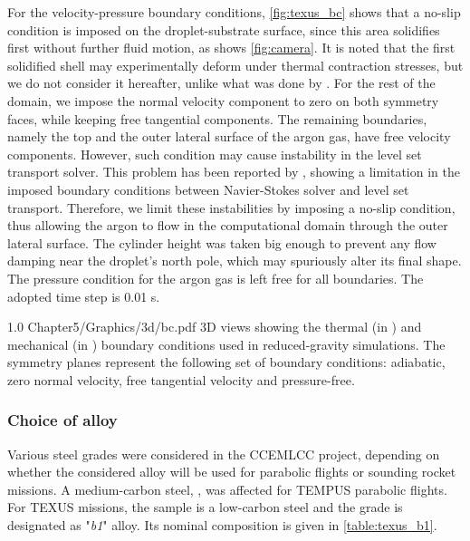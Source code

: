 For the velocity-pressure boundary conditions, \cref{fig:texus_bc} shows that a no-slip condition is imposed
on the droplet-substrate surface, 
since this area solidifies first without further fluid motion, as shows \cref{fig:camera}.
It is noted that the first solidified shell may experimentally deform under thermal contraction stresses, 
but we do not consider it hereafter, unlike what was done by \citet{rivaux_simulation_2011}. 
For the rest of the domain, we impose the normal velocity component to zero on both symmetry faces, 
while keeping free tangential components. The remaining boundaries, namely the top and the outer lateral surface of the argon gas,
have free velocity components. However, such condition may cause instability in the level set transport solver. 
This problem has been reported by \citep{basset_simulation_2006}, showing a limitation in the imposed boundary conditions between Navier-Stokes solver and level set transport. 
Therefore, we limit these instabilities by imposing a no-slip condition, thus allowing the argon to flow in the computational
domain through the outer lateral surface. 
The cylinder height was taken big enough to prevent any flow damping near the droplet's north pole,
which may spuriously alter its final shape. The pressure condition for the argon gas is left free for all boundaries.
The adopted time step is 0.01 s.

\begin{figureth}
{1.0}
{Chapter5/Graphics/3d/bc.pdf}
{3D views showing the thermal (in ) and mechanical (in ) boundary conditions used in reduced-gravity simulations.
The symmetry planes represent the following set of boundary conditions: adiabatic, zero normal velocity, free tangential velocity and pressure-free.}
\label{fig:texus_bc}
\end{figureth}

\subsubsection{Choice of alloy}

Various steel grades were considered in the CCEMLCC project, depending on whether the considered alloy will be used for parabolic flights
or sounding rocket missions. A medium-carbon steel, , was affected for TEMPUS parabolic flights.
For TEXUS missions, the sample is a low-carbon steel and the grade is designated as "\emph{b1}" alloy. Its nominal 
composition is given in \cref{table:texus_b1}. 

